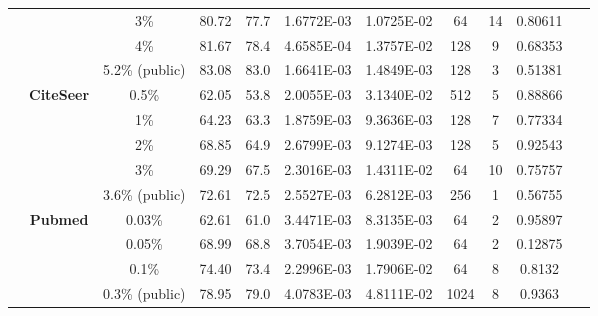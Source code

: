 \begin{table}[htbp]
\begin{tabular}{ccccc|cccccc}
          &       & 3\%   & \cellcolor[rgb]{ .388,  .745,  .482}80.72 & \cellcolor[rgb]{ .973,  .412,  .42}77.7 & 1.6772E-03 & 1.0725E-02 & 64    & 14    & 0.80611 & ~ \\
          &       & 4\%   & \cellcolor[rgb]{ .388,  .745,  .482}81.67 & \cellcolor[rgb]{ .973,  .412,  .42}78.4 & 4.6585E-04 & 1.3757E-02 & 128   & 9     & 0.68353 & ~ \\
          &       & 5.2\% (public) & \cellcolor[rgb]{ .388,  .745,  .482}83.08 & \cellcolor[rgb]{ .973,  .412,  .42}83.0 & 1.6641E-03 & 1.4849E-03 & 128   & 3     & 0.51381 & ~ \\
          & \multirow{5}[0]{*}{\textbf{CiteSeer}} & 0.5\% & \cellcolor[rgb]{ .388,  .745,  .482}62.05 & \cellcolor[rgb]{ .973,  .412,  .42}53.8 & 2.0055E-03 & 3.1340E-02 & 512   & 5     & 0.88866 & ~ \\
          &       & 1\%   & \cellcolor[rgb]{ .388,  .745,  .482}64.23 & \cellcolor[rgb]{ .973,  .412,  .42}63.3 & 1.8759E-03 & 9.3636E-03 & 128   & 7     & 0.77334 & ~ \\
          &       & 2\%   & \cellcolor[rgb]{ .388,  .745,  .482}68.85 & \cellcolor[rgb]{ .973,  .412,  .42}64.9 & 2.6799E-03 & 9.1274E-03 & 128   & 5     & 0.92543 & ~ \\
          &       & 3\%   & \cellcolor[rgb]{ .388,  .745,  .482}69.29 & \cellcolor[rgb]{ .973,  .412,  .42}67.5 & 2.3016E-03 & 1.4311E-02 & 64    & 10    & 0.75757 & ~ \\
          &       & 3.6\% (public) & \cellcolor[rgb]{ .388,  .745,  .482}72.61 & \cellcolor[rgb]{ .973,  .412,  .42}72.5 & 2.5527E-03 & 6.2812E-03 & 256   & 1     & 0.56755 & ~ \\
          & \multirow{4}[1]{*}{\textbf{Pubmed}} & 0.03\% & \cellcolor[rgb]{ .388,  .745,  .482}62.61 & \cellcolor[rgb]{ .973,  .412,  .42}61.0 & 3.4471E-03 & 8.3135E-03 & 64    & 2     & 0.95897 & ~ \\
          &       & 0.05\% & \cellcolor[rgb]{ .388,  .745,  .482}68.99 & \cellcolor[rgb]{ .973,  .412,  .42}68.8 & 3.7054E-03 & 1.9039E-02 & 64    & 2     & 0.12875 & ~ \\
          &       & 0.1\% & \cellcolor[rgb]{ .388,  .745,  .482}74.40 & \cellcolor[rgb]{ .973,  .412,  .42}73.4 & 2.2996E-03 & 1.7906E-02 & 64    & 8     & 0.8132 & ~ \\
          &       & 0.3\% (public) & \cellcolor[rgb]{ .973,  .412,  .42}78.95 & \cellcolor[rgb]{ .388,  .745,  .482}79.0 & 4.0783E-03 & 4.8111E-02 & 1024  & 8     & 0.9363 & ~ \\

\end{tabular}
\end{table}
